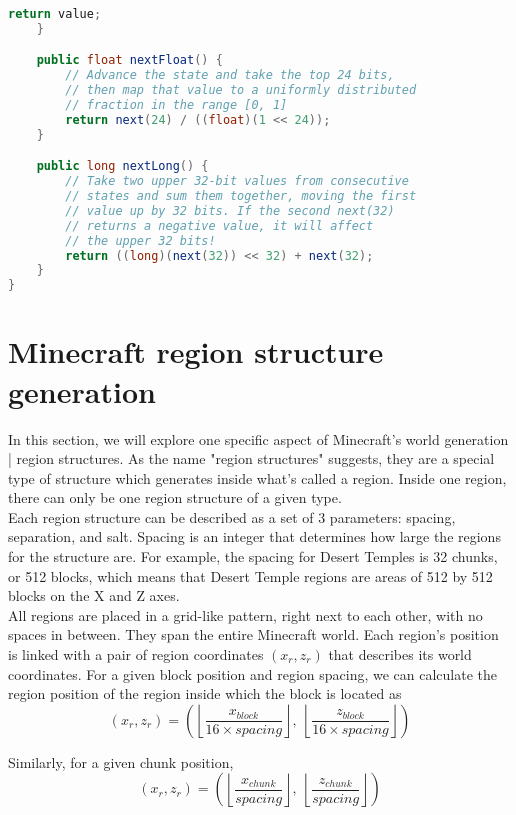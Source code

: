 \documentclass{article}
\begin{document}
\begin{lstlisting}[language=Java]
        return value;
    }

    public float nextFloat() {
        // Advance the state and take the top 24 bits, 
        // then map that value to a uniformly distributed 
        // fraction in the range [0, 1]
        return next(24) / ((float)(1 << 24));
    }

    public long nextLong() {
        // Take two upper 32-bit values from consecutive 
        // states and sum them together, moving the first 
        // value up by 32 bits. If the second next(32) 
        // returns a negative value, it will affect 
        // the upper 32 bits!
        return ((long)(next(32)) << 32) + next(32);
    }
}
\end{lstlisting}

\section{Minecraft region structure generation}\label{appendix.regionstructures}

In this section, we will explore one specific aspect of Minecraft's world generation | region structures.
As the name "region structures" suggests, they are a special type of structure which generates inside what's called a region. Inside one region, there can only be one region structure of a given type.\\
Each region structure can be described as a set of 3 parameters: spacing, separation, and salt. Spacing is an integer that determines how large the regions for the structure are. For example, the spacing for Desert Temples is 32 chunks, or 512 blocks, which means that Desert Temple regions are areas of 512 by 512 blocks on the X and Z axes. \\
All regions are placed in a grid-like pattern, right next to each other, with no spaces in between. They span the entire Minecraft world. Each region's position is linked with a pair of region coordinates $(x_r, z_r)$ that describes its world coordinates. For a given block position and region spacing, we can calculate the region position of the region inside which the block is located as
\begin{equation}
    (x_r, z_r) = \left( \left\lfloor \frac{x_{block}}{16 \times spacing} \right\rfloor,\ \left\lfloor \frac{z_{block}}{16 \times spacing} \right\rfloor \right)
\end{equation}

\noindent Similarly, for a given chunk position,
\begin{equation}
    (x_r, z_r) = \left( \left\lfloor \frac{x_{chunk}}{spacing} \right\rfloor,\ \left\lfloor \frac{z_{chunk}}{spacing} \right\rfloor \right)
\end{equation}
\end{document}
